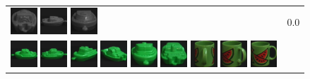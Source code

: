 \begin{figure}[tbp]
\begin{center}
\begin{tabular}{m{11cm} | m{3cm} |}
\includegraphics[width=1cm]{coil/beeld-26.eps}
\includegraphics[width=1cm]{coil/beeld-27.eps}
\includegraphics[width=1cm]{coil/beeld-28.eps}
& {\scriptsize 0.0}
\\
\includegraphics[width=1cm]{coil/beeld-54.eps}
\includegraphics[width=1cm]{coil/beeld-55.eps}
\includegraphics[width=1cm]{coil/beeld-57.eps}
\includegraphics[width=1cm]{coil/beeld-58.eps}
\includegraphics[width=1cm]{coil/beeld-56.eps}
\includegraphics[width=1cm]{coil/beeld-59.eps}
\includegraphics[width=1cm]{coil/beeld-35.eps}
\includegraphics[width=1cm]{coil/beeld-34.eps}
\includegraphics[width=1cm]{coil/beeld-30.eps}

\end{tabular}
\end{center}
\end{figure}
